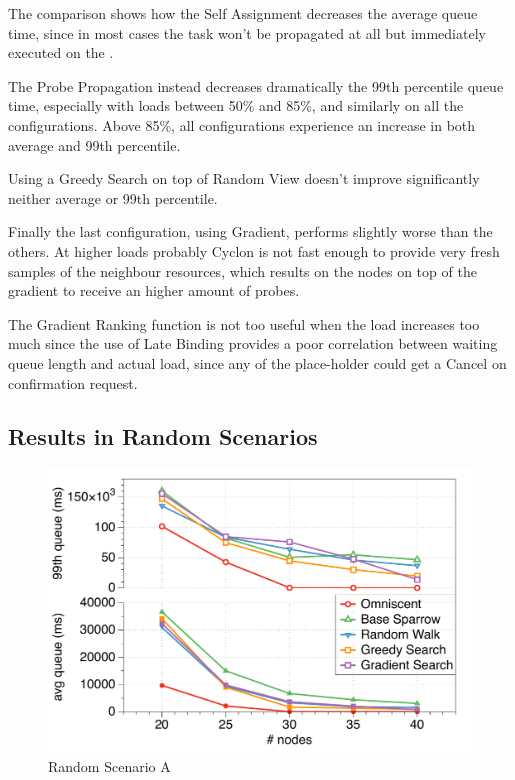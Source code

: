 \documentclass[conference]{IEEEtran}
\begin{document}
The comparison shows how the Self Assignment decreases the average queue time, since in most cases the task won't be propagated at all but immediately executed on the \tmast.

The Probe Propagation instead decreases dramatically the 99th percentile queue time, especially with loads between 50\% and 85\%, and similarly on all the configurations. Above 85\%, all configurations experience an increase in both average and 99th percentile. 

Using a Greedy Search on top of Random View doesn't improve significantly neither average or 99th percentile.

Finally the last configuration, using Gradient, performs slightly worse than the others. At higher loads probably Cyclon is not fast enough to provide very fresh samples of the neighbour resources, which results on the nodes on top of the gradient to receive an higher amount of probes. 

The Gradient Ranking function is not too useful when the load increases too much since the use of Late Binding provides a poor correlation between waiting queue length and actual load, since any of the place-holder could get a Cancel on confirmation request.

\subsection{Results in Random Scenarios}

\begin{figure}
\begin{center}
\includegraphics[scale=0.45]{figures/randomA}
\caption{Random Scenario A}
\label{fig:comparison}
\end{center}
\end{figure}
\end{document}
